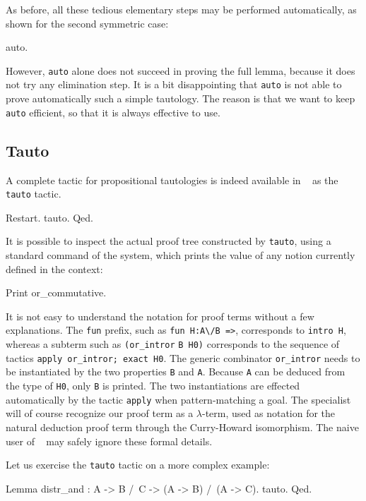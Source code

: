 \documentclass[11pt,a4paper]{book}
\begin{document}
As before, all these tedious elementary steps may be performed automatically,
as shown for the second symmetric case:

\begin{coq_example}
auto.
\end{coq_example}

However, \verb:auto: alone does not succeed in proving the full lemma, because
it does not try any elimination step.
It is a bit disappointing that \verb:auto: is not able to prove automatically 
such a simple tautology. The reason is that we want to keep
\verb:auto: efficient, so that it is always effective to use. 

\subsection{Tauto}

A complete tactic for propositional
tautologies is indeed available in \Coq~ as the \verb:tauto: tactic. 
\begin{coq_example}
Restart.
tauto.
Qed.
\end{coq_example}

It is possible to inspect the actual proof tree constructed by \verb:tauto:,
using a standard command of the system, which prints the value of any notion 
currently defined in the context:
\begin{coq_example}
Print or_commutative.
\end{coq_example}

It is not easy to understand the notation for proof terms without a few
explanations. The \texttt{fun} prefix, such as \verb+fun H:A\/B =>+, 
corresponds
to \verb:intro H:, whereas a subterm such as 
\verb:(or_intror: \verb:B H0):
corresponds to the sequence of tactics \verb:apply or_intror; exact H0:. 
The generic combinator \verb:or_intror: needs to be instantiated by
the two properties \verb:B: and \verb:A:. Because \verb:A: can be
deduced from the type of \verb:H0:, only  \verb:B: is printed.
The two instantiations are effected automatically by the tactic
\verb:apply: when pattern-matching a goal. The specialist will of course
recognize our proof term as a $\lambda$-term, used as notation for the
natural deduction proof term through the Curry-Howard isomorphism. The
naive user of \Coq~ may safely ignore these formal details.

Let us exercise the \verb:tauto: tactic on a more complex example:
\begin{coq_example}
Lemma distr_and : A -> B /\ C -> (A -> B) /\ (A -> C).
tauto.
Qed.
\end{coq_example}
\end{document}

